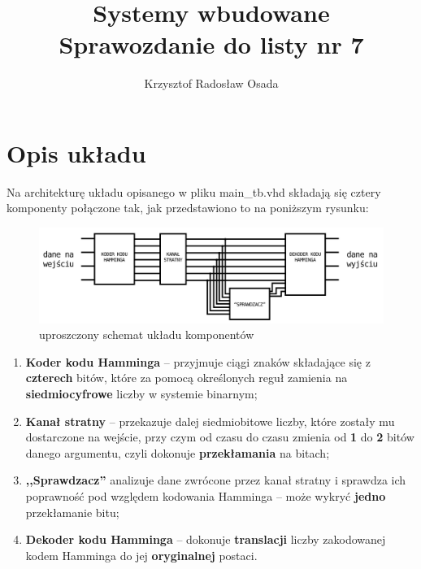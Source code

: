 \documentclass[a4paper,11pt]{article}
\author{Krzysztof Radosław Osada}
\title{\textbf{\Huge{Systemy wbudowane}}\\[3pt] Sprawozdanie do listy nr 7}
\newcommand*{\lineCode}{\fontfamily{cmtt}\selectfont}
\begin{document}
  \graphicspath{{/home/krymeer/Desktop/wbud/lista7/latex/}}

  \singlespacing
  \maketitle\thispagestyle{empty}
  \onehalfspacing

  \section{Opis układu}
  Na architekturę układu opisanego w pliku {\lineCode main\_tb.vhd} składają się cztery komponenty połączone tak, jak przedstawiono to na poniższym rysunku:
  \begin{figure}[H]\centering
    \includegraphics[width=1.2\textwidth,center]{circuit.png}
    \caption{uproszczony schemat układu komponentów}
  \end{figure}

  \begin{enumerate}
    \item \textbf{Koder kodu Hamminga} -- przyjmuje ciągi znaków składające się z \textbf{czterech} bitów, które za pomocą określonych reguł zamienia na \textbf{siedmiocyfrowe} liczby w systemie binarnym;
    \item \textbf{Kanał stratny} -- przekazuje dalej siedmiobitowe liczby, które zostały mu dostarczone na wejście, przy czym od czasu do czasu zmienia od \textbf{1} do \textbf{2} bitów danego argumentu, czyli dokonuje \textbf{przekłamania} na bitach;
    \item \textbf{,,Sprawdzacz''} analizuje dane zwrócone przez kanał stratny i sprawdza ich poprawność pod względem kodowania Hamminga -- może wykryć \textbf{jedno} przekłamanie bitu;
    \item \textbf{Dekoder kodu Hamminga} -- dokonuje \textbf{translacji} liczby zakodowanej kodem Hamminga do jej \textbf{oryginalnej} postaci.
  \end{enumerate}
\end{document}
